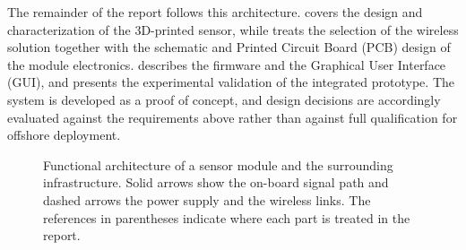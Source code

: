 The remainder of the report follows this architecture.  covers the design and characterization of the 3D-printed sensor, while  treats the selection of the wireless solution together with the schematic and Printed Circuit Board (PCB) design of the module electronics.  describes the firmware and the Graphical User Interface (GUI), and  presents the experimental validation of the integrated prototype. The system is developed as a proof of concept, and design decisions are accordingly evaluated against the requirements above rather than against full qualification for offshore deployment.

\begin{figure}
\centering

    \caption{Functional architecture of a sensor module and the surrounding infrastructure. Solid arrows show the on-board signal path and dashed arrows the power supply and the wireless links. The references in parentheses indicate where each part is treated in the report.}
    \label{fig:System_blocks}
\end{figure}